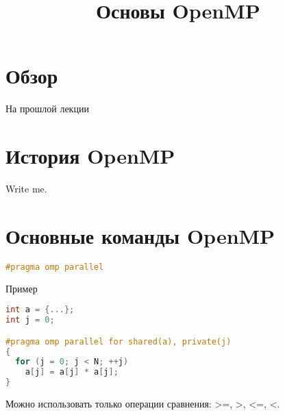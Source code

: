 

\title{Основы OpenMP}



\begin{frame}
\titlepage
\end{frame}

\section{Обзор}

\begin{frame}
\tableofcontents
\end{frame} 

\begin{frame}{На прошлой лекции}
\end{frame}


\section{История OpenMP}

\begin{frame}

\todo Write me.

\end{frame}

\section{Основные команды OpenMP}

\begin{frame}[fragile]

\begin{lstlisting}[language=C++,basicstyle=\ttfamily,keywordstyle=\color{blue},basicstyle=\scriptsize]
#pragma omp parallel
\end{lstlisting}

\end{frame}

\begin{frame}[fragile]{Пример}

\begin{lstlisting}[language=C++,basicstyle=\ttfamily,keywordstyle=\color{blue},basicstyle=\scriptsize]
int a = {...};
int j = 0;

#pragma omp parallel for shared(a), private(j)
{
  for (j = 0; j < N; ++j)
    a[j] = a[j] * a[j];
}
\end{lstlisting}

Можно использовать только операции сравнения: >=, >, <=, <.

\end{frame}


